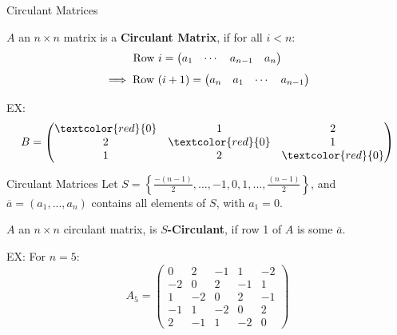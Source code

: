 \documentclass[10pt]{beamer}
\begin{document}
\begin{frame}{Circulant Matrices}
    \begin{definition}
        $A$ an $n\times n$ matrix is a \textbf{Circulant Matrix}, if for all $i<n$:
        $$\textmd{Row }i = \begin{pmatrix}
            a_1 & \cdots & a_{n-1} & a_n
        \end{pmatrix}$$
        $$\implies \textmd{Row }(i+1) = \begin{pmatrix}
            a_n & a_1 & \cdots & a_{n-1}
        \end{pmatrix}$$
    \end{definition}

    EX:
    \[B=\begin{pmatrix}
        \textcolor{red}{0}&1&2\\2&\textcolor{red}{0}&1\\1&2&\textcolor{red}{0}
    \end{pmatrix}\]
\end{frame}
\begin{frame}{Circulant Matrices}
    Let $S=\left\{\frac{-(n-1)}{2},...,-1,0,1,...,\frac{(n-1)}{2}\right\}$, and $\overline{a}=(a_1,...,a_n)$ contains all elements of $S$, with $a_1=0$.

    \begin{definition}
        $A$ an $n\times n$ circulant matrix, is $S$\textbf{-Circulant}, if row 1 of $A$ is some $\overline{a}$.
    \end{definition}

    EX: For $n=5$:
    \[A_{5}=\begin{pmatrix}
        0&2&-1&1&-2\\
        -2&0&2&-1&1\\
        1&-2&0&2&-1\\
        -1&1&-2&0&2\\
        2&-1&1&-2&0
    \end{pmatrix}\]
\end{frame}
\end{document}
